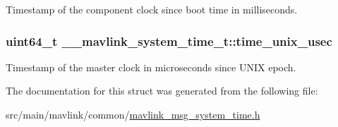 Timestamp of the component clock since boot time in milliseconds. 

\hypertarget{struct____mavlink__system__time__t_ae546feebc5c1920448812ff0f2432366}{
\subsubsection[{time\+\_\+unix\+\_\+usec}]{\setlength{\rightskip}{0pt plus 5cm}uint64\+\_\+t \+\_\+\+\_\+mavlink\+\_\+system\+\_\+time\+\_\+t\+::time\+\_\+unix\+\_\+usec}}\label{struct____mavlink__system__time__t_ae546feebc5c1920448812ff0f2432366}


Timestamp of the master clock in microseconds since U\+N\+I\+X epoch. 



The documentation for this struct was generated from the following file\+:\begin{DoxyCompactItemize}
\item 
src/main/mavlink/common/\hyperlink{mavlink__msg__system__time_8h}{mavlink\+\_\+msg\+\_\+system\+\_\+time.\+h}\end{DoxyCompactItemize}
